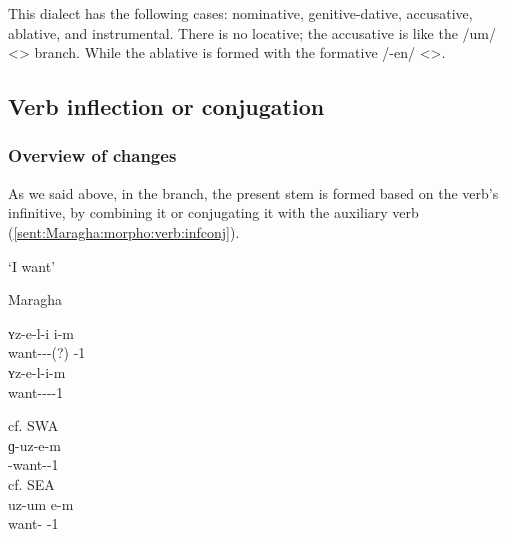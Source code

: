 This dialect has the following cases: nominative, genitive-dative, accusative, ablative, and instrumental. There is no locative; the accusative is like the /um/ <> branch. While the ablative is formed with the formative /-en/ <>. 

\subsection{Verb inflection or conjugation}

\subsubsection{Overview of changes}\label{sec:Maragha:morpho:verb:overview}

 

As we said above, in the  branch, the present stem is formed based on the verb's infinitive, by combining it or conjugating it with the auxiliary verb (\ref{sent:Maragha:morpho:verb:infconj}). 

\begin{exe}
	\ex `I want' \label{sent:Maragha:morpho:verb:infconj} \begin{xlist}
		\ex Maragha
		\begin{xlist}
			\ex \gll ʏz-e-l-i i-m \\
			want-{\thgloss}-{\infgloss}-{\impfcvb}(?) {\aux}-1{\sg} \\
			\trans {} \label{sent:Maragha:morpho:verb:infconj:base} 
			\ex \gll ʏz-e-l-i-m \\
			want-{\thgloss}-{\infgloss}-{\aux}-1{\sg} \\
			\trans {} \label{sent:Maragha:morpho:verb:infconj:merged} 
		\end{xlist}
		\ex cf. SWA \\
		\gll ɡ-uz-e-m \\
		{\ind}-want-{\thgloss}-1{\sg} \\
		\trans {}
		\ex cf. SEA \\
		\gll uz-um e-m \\
		want-{\impfcvb} {\aux}-1{\sg} \\
		\trans {}
	\end{xlist}
	
\end{exe}


\begin{adjarianpage}\label{page:283}\end{adjarianpage}%


